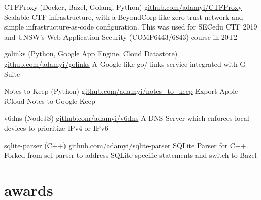 \documentclass[hidelinks__VERSION__]{adamyi-cv}
\begin{document}
\begin{entrylist}


\entry
{CTFProxy (Docker, Bazel, Golang, Python)}
{\href{https://github.com/adamyi/CTFProxy}{github.com/adamyi/CTFProxy}}
{Scalable CTF infrastructure, with a BeyondCorp-like zero-trust network and simple infrastructure-as-code configuration. This was used for SECedu CTF 2019 and UNSW's Web Application Security (COMP6443/6843) course in 20T2}


\entry
{golinks (Python, Google App Engine, Cloud Datastore)}
{\href{https://github.com/adamyi/golinks}{github.com/adamyi/golinks}}
{A Google-like go/ links service integrated with G Suite}


\entry
{Notes to Keep (Python)}
{\href{https://github.com/adamyi/notes_to_keep}{github.com/adamyi/notes\_to\_keep}}
{Export Apple iCloud Notes to Google Keep}


\entry
{v6dns (NodeJS)}
{\href{https://github.com/adamyi/v6dns}{github.com/adamyi/v6dns}}
{A DNS Server which enforces local devices to prioritize IPv4 or IPv6}


\entry
{sqlite-parser (C++)}
{\href{https://github.com/adamyi/sqlite-parser}{github.com/adamyi/sqlite-parser}}
{SQLite Parser for C++. Forked from sql-parser to address SQLite specific statements and switch to Bazel}


\end{entrylist}



\section{awards}
\end{document}
